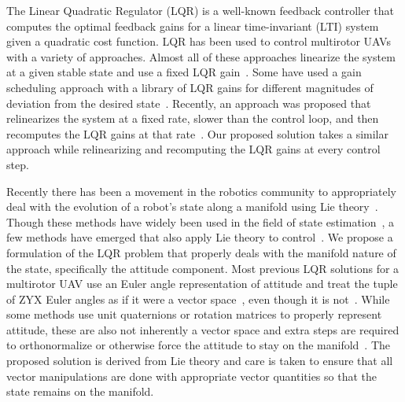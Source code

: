 

The Linear Quadratic Regulator (LQR) is a well-known feedback controller that
computes the optimal feedback gains for a linear time-invariant (LTI) system
given a quadratic cost function. LQR has been used to control multirotor UAVs with a variety of
approaches. Almost all of these approaches
linearize the system at a given stable state and use a fixed LQR
gain~\cite{cowling2007prototype}. Some have
used a gain scheduling approach with a library of LQR gains for different
magnitudes of deviation from the desired state~\cite{reyes2013lqr}. Recently, an approach was
proposed that relinearizes the system at a fixed rate, slower than the control
loop, and then recomputes the LQR gains at that rate~\cite{foehn2018onboard}. Our
proposed solution takes a similar approach while relinearizing and recomputing
the LQR gains at every control step. 

Recently there has been a movement in the robotics community to appropriately
deal with the evolution of a robot's state along a manifold using Lie
theory~\cite{sola2018micro}. Though these methods have widely been used in the
field of state estimation~\cite{sola2017quaternion,koch2017relative}, a
few methods have emerged that also apply Lie theory to
control~\cite{yu2015high,lee2010geometric}. We propose a formulation of
the LQR problem that properly deals with the manifold nature of the state,
specifically the attitude component. Most previous LQR solutions
for a multirotor UAV use an Euler angle representation of attitude and treat the
tuple of ZYX Euler angles as if it were a vector space~\cite{cowling2007prototype}, even
though it is not~\cite{diebel2006representing}. While some methods use unit
quaternions or rotation matrices to properly represent attitude, these are also
not inherently a vector space and extra steps are required to orthonormalize or
otherwise force the attitude to stay on the
manifold~\cite{reyes2013lqr,foehn2018onboard}. The proposed solution is
derived from Lie theory and care is taken to ensure that all vector
manipulations are done with
appropriate vector quantities so that the state remains on the manifold.

